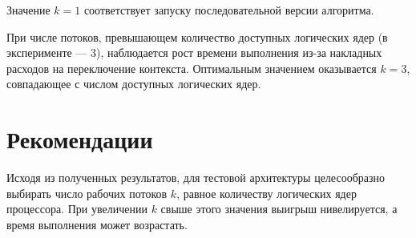 Значение $k=1$ соответствует запуску последовательной версии алгоритма.

При числе потоков, превышающем количество доступных логических ядер (в эксперименте --- 3),
наблюдается рост времени выполнения из-за накладных расходов на переключение контекста.
Оптимальным значением оказывается $k=3$, совпадающее с числом доступных логических ядер.

\section*{Рекомендации}
Исходя из полученных результатов, для тестовой архитектуры целесообразно выбирать число
рабочих потоков $k$, равное количеству логических ядер процессора. При увеличении $k$ свыше
этого значения выигрыш нивелируется, а время выполнения может возрастать.

\clearpage
